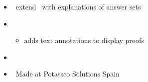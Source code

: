 \begin{frame}{\xclingo}
  \begin{itemize}
  \item {} \ extend \clingo\ with explanations of answer sets
  \item {} \
    \begin{itemize}
    \item adds text annotations to display proofs
    \end{itemize}
  \item {} \ \cite{cafabr20a}
  \item {} \ Made at Potassco Solutions Spain
  \end{itemize}
\end{frame}
%

